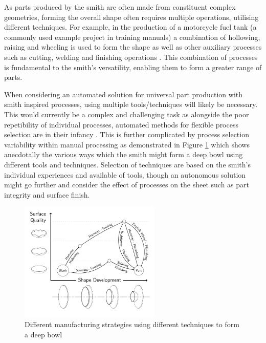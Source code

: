 As parts produced by the smith are often made from constituent complex geometries, forming the overall shape often requires multiple operations, utilising different techniques. For example, in the production of a motorcycle fuel tank (a commonly used example project in training manuals) a combination of hollowing, raising and wheeling is used to form the shape as well as other auxiliary processes such as cutting, welding and finishing operations \citep{Barr2013ProfessionalFabrication}. This combination of processes is fundamental to the smith's versatility, enabling them to form a greater range of parts.

When considering an automated solution for universal part production with smith inspired processes, using multiple tools/techniques will likely be necessary. This would currently be a complex and challenging task as alongside the poor repetibility of individual processes, automated methods for flexible process selection are in their infancy \citep{Hamouche2018ClassificationLearning}. This is further complicated by process selection variability within manual processing as demonstrated in Figure \ref{fig:ShapeDevBowl} which shows anecdotally the various ways which the smith might form a deep bowl using different tools and techniques. Selection of techniques are based on the smith's individual experiences and available of tools, though an autonomous solution might go further and consider the effect of processes on the sheet such as part integrity and surface finish.

\begin{figure}[h]
    \centering
    \includegraphics[width=0.6\textwidth]{Images/Bowl.pdf}
    \caption{Different manufacturing strategies using different techniques to form a deep bowl}
    \label{fig:ShapeDevBowl}
\end{figure}

